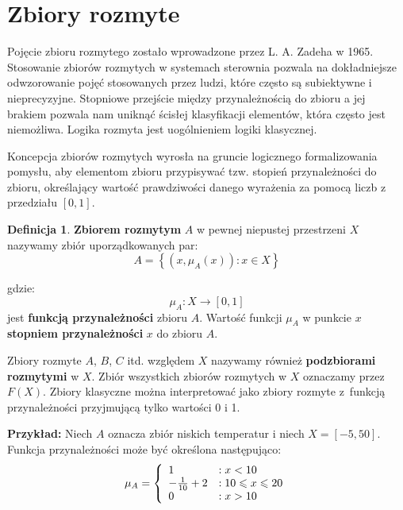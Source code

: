 \documentclass[a4paper,12pt]{article}
\theoremstyle{definition}
\newtheorem{df}{Definicja}
\begin{document}

\section{Zbiory rozmyte}

Pojęcie zbioru rozmytego zostało wprowadzone przez L. A. Zadeha w 1965. Stosowanie zbiorów rozmytych w systemach sterownia pozwala na dokładniejsze odwzorowanie pojęć stosowanych przez ludzi, które często są subiektywne i nieprecyzyjne. Stopniowe przejście między przynależnością do zbioru a jej brakiem pozwala nam uniknąć ścisłej klasyfikacji elementów, która często jest niemożliwa. Logika rozmyta jest uogólnieniem logiki klasycznej. 

Koncepcja zbiorów rozmytych wyrosła na gruncie logicznego formalizowania pomysłu, aby elementom zbioru przypisywać tzw. stopień przynależności do zbioru, określający wartość prawdziwości danego wyrażenia za pomocą liczb z przedziału \(\left[0,1\right]\). 

\begin{df}
\textbf{Zbiorem rozmytym} $A$ w pewnej niepustej przestrzeni $X$ nazywamy zbiór uporządkowanych par:
\begin{equation}
A = \left\{
\left( 
x , \mu_A(x)
\right)\!\colon x \in X
\right\}
\end{equation}

gdzie:
\begin{equation}
\mu_A \colon X \rightarrow \left[0,1\right]
\end{equation} 
jest \textbf{funkcją przynależności} zbioru \(A\).
Wartość funkcji \(\mu_A\) w punkcie $x$ \textbf{stopniem przynależności} $x$ do zbioru \(A\). 
\end{df}


Zbiory rozmyte $A$, \(B\), \(C\) itd. względem \(X\) nazywamy również \textbf{podzbiorami rozmytymi} w \(X\).
Zbiór wszystkich zbiorów rozmytych w \(X\) oznaczamy przez \(F(X)\). Zbiory klasyczne można interpretować jako zbiory rozmyte z~funkcją przynależności przyjmującą tylko wartości 0 i 1.

\medskip
\noindent
{\bf Przykład:} Niech  $A$ oznacza zbiór niskich temperatur i niech \(X=[-5,50]\). Funkcja przynależności może być określona następująco:
\begin{equation}
\mu_A=\left\lbrace
\begin{array}[c]{ll}
1 					&:x<10\\
- \frac{1}{10}+2 	&:10\leqslant x\leqslant20 \\
0					&:x>10
\end{array}
\right.%
\end{equation}
\end{document}
